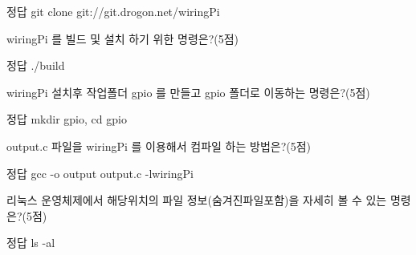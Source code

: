 \documentclass[A4paper,chapter,footnote,5pt]{oblivoir}
\begin{document}
\begin{Exlist}
\begin{solution}\begin{explain}
\item[정답] git clone git://git.drogon.net/wiringPi
\end{explain}\end{solution}



\item wiringPi 를 빌드 및 설치 하기 위한 명령은?(5점)

\begin{solution}\begin{explain}
\item[정답] ./build
\end{explain}\end{solution}


\item wiringPi 설치후 작업폴더 gpio 를 만들고 gpio 폴더로 이동하는 명령은?(5점)

\begin{solution}\begin{explain}
\item[정답] mkdir gpio, cd gpio
\end{explain}\end{solution}


\item output.c 파일을 wiringPi 를 이용해서 컴파일 하는 방법은?(5점)

\begin{solution}\begin{explain}
\item[정답] gcc -o output output.c -lwiringPi
\end{explain}\end{solution}

\item 리눅스 운영체제에서 해당위치의 파일 정보(숨겨진파일포함)을 자세히 볼 수 있는 명령은?(5점)
\begin{solution}\begin{explain}
\item[정답] ls -al
\end{explain}\end{solution}



\end{Exlist}
\end{document}
